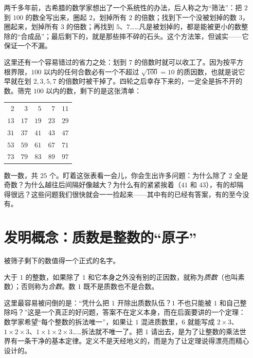 两千多年前，古希腊的数学家想出了一个系统性的办法，后人称之为“筛法”：把 $2$ 到 $100$ 的数全写出来，圈起 $2$，划掉所有 $2$ 的倍数；找到下一个没被划掉的数 $3$，圈起来，划掉所有 $3$ 的倍数；再找到 $5$、$7$……凡是被划掉的，都是能被更小的数整除的“合成品”；最后剩下的，就是那些摔不碎的石头。这个方法笨，但诚实——它保证一个不漏。

这里还有一个容易错过的省力之处：划到 $7$ 的倍数时就可以收工了。因为按平方根界限，$100$ 以内的任何合数必有一个不超过 $\sqrt{100}=10$ 的质因数，也就是说它早就在划 $2,3,5,7$ 的倍数时被干掉了。四轮之后幸存下来的，一定全是拆不开的数。筛完 $100$ 以内的数，剩下的是这张清单：

\begin{center}
\begin{tabular}{rrrrr}
\toprule
$2$ & $3$ & $5$ & $7$ & $11$\\
$13$ & $17$ & $19$ & $23$ & $29$\\
$31$ & $37$ & $41$ & $43$ & $47$\\
$53$ & $59$ & $61$ & $67$ & $71$\\
$73$ & $79$ & $83$ & $89$ & $97$\\
\bottomrule
\end{tabular}
\end{center}

数一数，共 $25$ 个。盯着这张表看一会儿，你会生出许多问题：为什么除了 $2$ 全是奇数？为什么越往后间隔好像越大？为什么有的紧紧挨着（$41$ 和 $43$），有的却隔得很远？这些问题我们很快就会一一捡起来——其中有的已经有答案，有的至今没有。

\section{发明概念：质数是整数的“原子”}

被筛子剩下的数值得一个正式的名字。

\begin{dingyi}[质数与合数]
大于 $1$ 的整数，如果除了 $1$ 和它本身之外没有别的正因数，就称为\emph{质数}（也叫素数）；否则称为\emph{合数}。数 $1$ 既不是质数也不是合数。
\end{dingyi}

这里最容易被问倒的是：“凭什么把 $1$ 开除出质数队伍？$1$ 不也只能被 $1$ 和自己整除吗？”这是一个真正的好问题，答案不在定义本身，而在后面要讲的一个定理：数学家希望“每个整数的拆法唯一”，如果让 $1$ 混进质数里，$6$ 就能写成 $2\times3$、$1\times2\times3$、$1\times1\times2\times3$……拆法就不唯一了。把 $1$ 请出去，是为了让整数的乘法世界有一条干净的基本定律。定义不是天经地义的，而是为了让定理说得漂亮而精心设计的。


